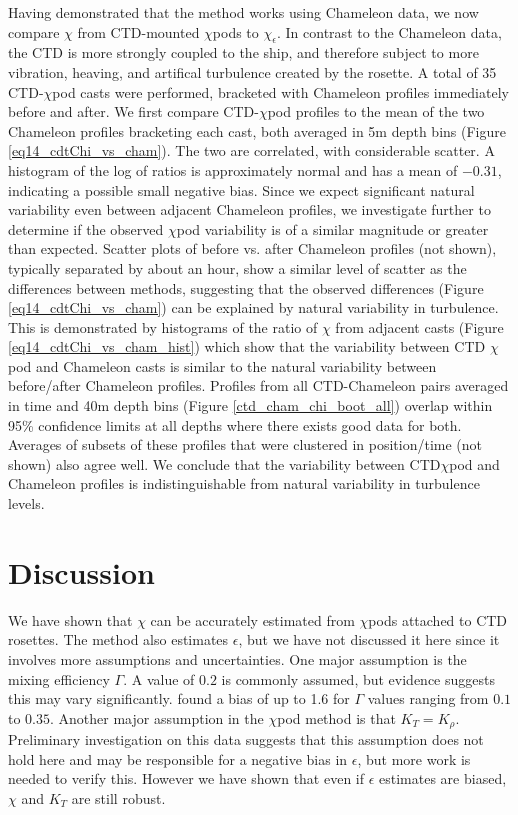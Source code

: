 \documentclass{ametsoc}
\begin{document}
Having demonstrated that the method works using Chameleon data, we now compare $\chi$ from CTD-mounted $\chi$pods to $\chi_{\epsilon}$. In contrast to the Chameleon data, the CTD is more strongly coupled to the ship, and therefore subject to more vibration, heaving, and artifical turbulence created by the rosette. A total of 35 CTD-$\chi$pod casts were performed, bracketed with Chameleon profiles immediately before and after. We first compare CTD-$\chi$pod profiles to the mean of the two Chameleon profiles bracketing each cast, both averaged in 5m depth bins (Figure \ref{eq14_cdtChi_vs_cham}). The two are correlated, with considerable scatter. A histogram of the log of ratios is approximately normal and has a mean of $-0.31$, indicating a possible small negative bias. Since we expect significant natural variability even between adjacent Chameleon profiles, we investigate further to determine if the observed $\chi$pod variability is of a similar magnitude or greater than expected. Scatter plots of before vs. after Chameleon profiles (not shown), typically separated by about an hour, show a similar level of scatter as the differences between methods, suggesting that the observed differences (Figure \ref{eq14_cdtChi_vs_cham}) can be explained by natural variability in turbulence. This is demonstrated by histograms of the ratio of $\chi$ from adjacent casts (Figure \ref{eq14_cdtChi_vs_cham_hist}) which show that the variability between CTD $\chi$pod and Chameleon casts is similar to the natural variability between before/after Chameleon profiles. Profiles from all CTD-Chameleon pairs averaged in time and 40m depth bins (Figure \ref{ctd_cham_chi_boot_all}) overlap within 95\% confidence limits at all depths where there exists good data for both. Averages of subsets of these profiles that were clustered in position/time (not shown) also agree well. We conclude that the variability between CTD$\chi$pod and Chameleon profiles is indistinguishable from natural variability in turbulence levels.


\section{Discussion}

We have shown that $\chi$ can be accurately estimated from $\chi$pods attached to CTD rosettes. The method also estimates $\epsilon$, but we have not discussed it here since it involves more assumptions and uncertainties. One major assumption is the mixing efficiency $\Gamma$. A value of $0.2$ is commonly assumed, but evidence suggests this may vary significantly. \cite{moumnash09} found a bias of up to 1.6 for $\Gamma$ values ranging from $0.1$ to $0.35$.  Another major assumption in the $\chi$pod method is that $K_T=K_{\rho}$. Preliminary investigation on this data suggests that this assumption does not hold here and may be responsible for a negative bias in $\epsilon$, but more work is needed to verify this. However we have shown that even if $\epsilon$ estimates are biased, $\chi$ and $K_T$ are still robust.
\end{document}
